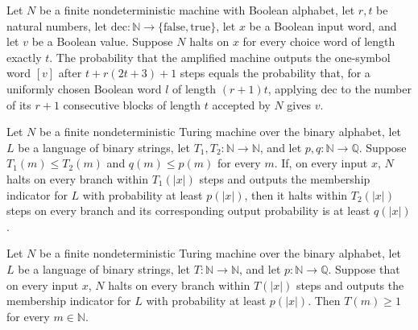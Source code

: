 \begin{theorem}
\label{Randomized.Amplify.amp_outputProb_pos}
\leanok
{}
Let $N$ be a finite nondeterministic machine with Boolean alphabet, let $r,t$ be natural
numbers, let $\mathrm{dec}:\mathbb{N}\to\{\mathrm{false},\mathrm{true}\}$, let $x$ be a
Boolean input word, and let $v$ be a Boolean value. Suppose $N$ halts on $x$ for every
choice word of length exactly $t$. The probability that the amplified machine outputs
the one-symbol word $[v]$ after $t+r(2t+3)+1$ steps equals the probability that, for a
uniformly chosen Boolean word $l$ of length $(r+1)t$, applying $\mathrm{dec}$ to the
number of its $r+1$ consecutive blocks of length $t$ accepted by $N$ gives $v$.
\end{theorem}

\begin{theorem}
\label{Turing.FinNDTM.BPDecidesInTimeWith.mono}
\leanok
{}
Let $N$ be a finite nondeterministic Turing machine over the binary alphabet, let $L$ be
a language of binary strings, let $T_1,T_2\colon\mathbb{N}\to\mathbb{N}$, and let
$p,q\colon\mathbb{N}\to\mathbb{Q}$. Suppose $T_1(m)\le T_2(m)$ and $q(m)\le p(m)$ for
every $m$. If, on every input $x$, $N$ halts on every branch within $T_1(|x|)$ steps and
outputs the membership indicator for $L$ with probability at least $p(|x|)$, then it
halts within $T_2(|x|)$ steps on every branch and its corresponding output probability
is at least $q(|x|)$.
\end{theorem}

\begin{theorem}
\label{Turing.FinNDTM.BPDecidesInTimeWith.one_le}
\leanok
{}
Let $N$ be a finite nondeterministic Turing machine over the binary alphabet, let $L$ be
a language of binary strings, let $T\colon\mathbb{N}\to\mathbb{N}$, and let
$p\colon\mathbb{N}\to\mathbb{Q}$. Suppose that on every input $x$, $N$ halts on every
branch within $T(|x|)$ steps and outputs the membership indicator for $L$ with
probability at least $p(|x|)$. Then $T(m)\ge 1$ for every $m\in\mathbb{N}$.
\end{theorem}

